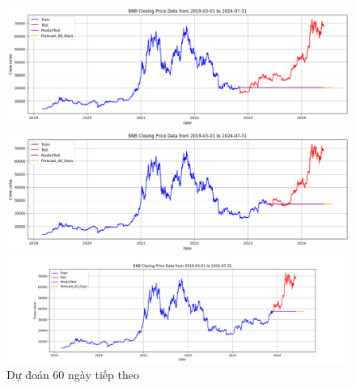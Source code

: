 \documentclass[conference]{IEEEtran}
\begin{document}
\begin{figure}[H]
    \centering
    \begin{minipage}{0.15\textwidth}
    \centering
    \includegraphics[width=1\textwidth]{Figure/ARIMA_BTC_60days_73.png}
    \end{minipage}
    \hfill
    \begin{minipage}{0.15\textwidth}
    \centering
    \includegraphics[width=1\textwidth]{Figure/ARIMA_BTC_60days_82.png}
    \end{minipage}
    \hfill
    \begin{minipage}{0.15\textwidth}
    \centering
    \includegraphics[width=1\textwidth]{Figure/ARIMA_BTC_60days_91.png}
    \end{minipage}
    \caption{Dự đoán 60 ngày tiếp theo}
    \label{fig:1}
\end{figure}
\end{document}
